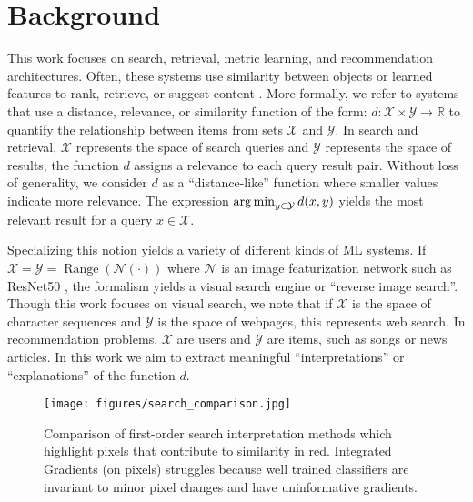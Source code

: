 \documentclass{article} %
\DeclareMathOperator*{\Range}{Range}
\begin{document}
\vspace{-.1in}
\section{Background}
\vspace{-.1in}
This work focuses on search, retrieval, metric learning, and recommendation architectures. Often, these systems use similarity between objects or learned features \citep{bengio2013representation} to rank, retrieve, or suggest content \citep{bing_2017,su2009survey,chopra2005learning,CLIP}. More formally, we refer to systems that use a distance, relevance, or similarity function of the form: $d: \mathcal{X} \times \mathcal{Y} \to \mathbb{R}$ to quantify the relationship between items from sets $\mathcal{X}$ and $\mathcal{Y}$. In search and retrieval, $\mathcal{X}$ represents the space of search queries and $\mathcal{Y}$ represents the space of results, the function $d$ assigns a relevance to each query result pair. Without loss of generality, we consider $d$ as a ``distance-like'' function where smaller values indicate more relevance. The expression $\operatorname*{arg\,min}_{y \in \mathcal{Y}} d(x,y)$ yields the most relevant result for a query $x \in \mathcal{X}$.

Specializing this notion yields a variety of different kinds of ML systems. If $\mathcal{X} = \mathcal{Y} = \Range(\mathcal{N}(\cdot))$ where $\mathcal{N}$ is an image featurization network such as ResNet50 \citep{he2016deep}, the formalism yields a visual search engine or ``reverse image search''. Though this work focuses on visual search, we note that if $\mathcal{X}$ is the space of character sequences and $\mathcal{Y}$ is the space of webpages, this represents web search. In recommendation problems, $\mathcal{X}$ are users and $\mathcal{Y}$ are items, such as songs or news articles. In this work we aim to extract meaningful ``interpretations'' or ``explanations'' of the function $d$.

\begin{figure*}
    \centering
    \texttt{[image: figures/search\_comparison.jpg]}
    \vspace{-.3in}
    \caption{Comparison of first-order search interpretation methods which highlight pixels that contribute to similarity in red. Integrated Gradients (on pixels) struggles because well trained classifiers are invariant to minor pixel changes and have uninformative gradients.}
    \label{fig:comparison}
    \vspace{-.1in}
\end{figure*}
\end{document}
